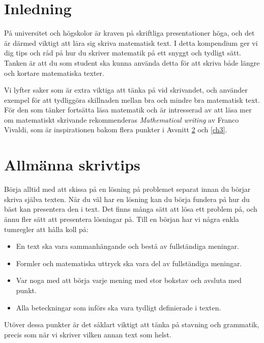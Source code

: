 \documentclass[titlepage]{article}
\begin{document}
\section{Inledning}

På universitet och högskolor är kraven på skriftliga presentationer höga, och det är därmed viktigt att lära sig skriva matematisk text. I detta kompendium ger vi dig tips och råd på hur du skriver matematik på ett snyggt och tydligt sätt. Tanken är att du som student ska kunna använda detta för att skriva både längre och kortare matematiska texter.

Vi lyfter saker som är extra viktiga att tänka på vid skrivandet, och använder exempel för att tydliggöra skillnaden mellan bra och mindre bra matematisk text. För den som tänker fortsätta läsa matematik och är intresserad av att läsa mer om matematiskt skrivande rekommenderas \textit{Mathematical writing} av Franco Vivaldi\cite{vivaldi}, som är inspirationen bakom flera punkter i Avsnitt \ref{ch2} och \ref{ch3}.




\section{Allmänna skrivtips}\label{ch2}

Börja alltid med att skissa på en lösning på problemet separat innan du börjar skriva själva texten. När du väl har en lösning kan du börja fundera på hur du bäst kan presentera den i text. Det finns många sätt att lösa ett problem på, och ännu fler sätt att presentera lösningar på. Till en början har vi några enkla tumregler att hålla koll på:

\begin{itemize}
    \item En text ska vara sammanhängande och bestå av fullständiga meningar.
    \item Formler och matematiska uttryck ska vara del av fullständiga meningar.
    \item Var noga med att börja varje mening med stor bokstav och avsluta med punkt.
    \item Alla beteckningar som införs ska vara tydligt definierade i texten.
\end{itemize}

Utöver dessa punkter är det såklart viktigt att tänka på stavning och grammatik, precis som när vi skriver vilken annan text som helst.
\end{document}
